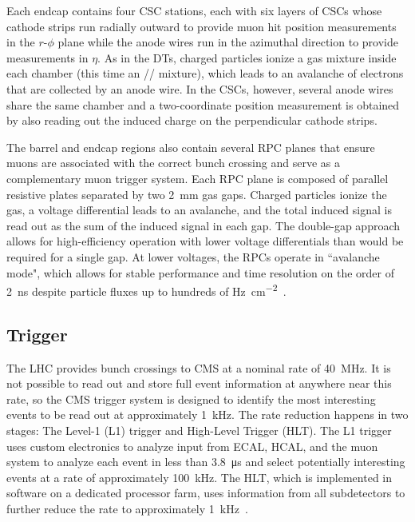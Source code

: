 Each endcap contains four CSC stations, each with six layers of CSCs whose cathode strips run radially outward to provide muon hit position measurements in the $r$-$\phi$ plane while the anode wires run in the azimuthal direction to provide measurements in $\eta$. As in the DTs, charged particles ionize a gas mixture inside each chamber (this time an // mixture), which leads to an avalanche of electrons that are collected by an anode wire. In the CSCs, however, several anode wires share the same chamber and a two-coordinate position measurement is obtained by also reading out the induced charge on the perpendicular cathode strips.

The barrel and endcap regions also contain several RPC planes that ensure muons are associated with the correct bunch crossing and serve as a complementary muon trigger system. Each RPC plane is composed of parallel resistive plates separated by two \SI{2}{\mm} gas gaps. Charged particles ionize the gas, a voltage differential leads to an avalanche, and the total induced signal is read out as the sum of the induced signal in each gap. The double-gap approach allows for high-efficiency operation with lower voltage differentials than would be required for a single gap. At lower voltages, the RPCs operate in ``avalanche mode", which allows for stable performance and time resolution on the order of \SI{2}{\ns} despite particle fluxes up to hundreds of \si{\Hz\per\cm\tothe{2}}~\cite{cms_experiment, pdg_2020, rpc_run2}.

\subsection{Trigger}
\label{trigger}
The LHC provides bunch crossings to CMS at a nominal rate of \SI{40}{\MHz}. It is not possible to read out and store full event information at anywhere near this rate, so the CMS trigger system is designed to identify the most interesting events to be read out at approximately \SI{1}{\kHz}. The rate reduction happens in two stages: The Level-1 (L1) trigger and High-Level Trigger (HLT). The L1 trigger uses custom electronics to analyze input from ECAL, HCAL, and the muon system to analyze each event in less than \SI{3.8}{\us} and select potentially interesting events at a rate of approximately \SI{100}{\kHz}. The HLT, which is implemented in software on a dedicated processor farm, uses information from all subdetectors to further reduce the rate to approximately \SI{1}{\kHz}~\cite{cms_experiment, trigger_run2}.

